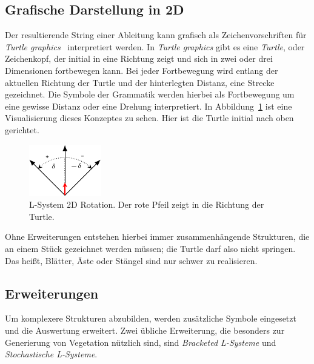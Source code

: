 \subsection{Grafische Darstellung in 2D}
Der resultierende String einer Ableitung kann grafisch als Zeichenvorschriften für \textit{Turtle graphics}~\cite{GOLDMAN20041471} interpretiert werden.
In \textit{Turtle graphics} gibt es eine \textit{Turtle}, oder Zeichenkopf, der initial in eine Richtung zeigt und sich in zwei oder drei Dimensionen fortbewegen kann.
Bei jeder Fortbewegung wird entlang der aktuellen Richtung der Turtle und der hinterlegten Distanz, eine Strecke gezeichnet.
Die Symbole der Grammatik werden hierbei als Fortbewegung um eine gewisse Distanz oder eine Drehung interpretiert.
In Abbildung~\ref{fig:L-System 2D Rotation} ist eine Visualisierung dieses Konzeptes zu sehen.
Hier ist die Turtle initial nach oben gerichtet.

\begin{figure}[ht]
    \centering
    \includegraphics[width=0.5\linewidth]{chapters/02_Grundlagen/L_System/L_System_2D.pdf}
    \caption{L-System 2D Rotation. Der rote Pfeil zeigt in die Richtung der Turtle.}\label{fig:L-System 2D Rotation}
\end{figure}

Ohne Erweiterungen entstehen hierbei immer zusammenhängende Strukturen, die an einem Stück gezeichnet werden müssen; die Turtle darf also nicht springen.
Das heißt, Blätter, Äste oder Stängel sind nur schwer zu realisieren.


\subsection{Erweiterungen}
Um komplexere Strukturen abzubilden, werden zusätzliche Symbole eingesetzt und die Auswertung erweitert.
Zwei übliche Erweiterung, die besonders zur Generierung von Vegetation nützlich sind, sind \textit{Bracketed L-Systeme} und \textit{Stochastische L-Systeme}.

